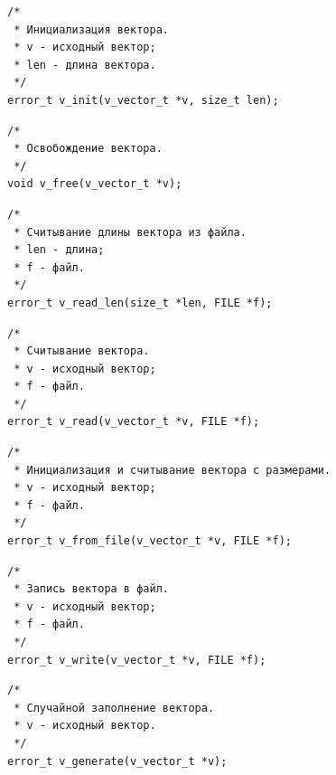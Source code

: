 \documentclass[a4paper,12pt]{extarticle}
\begin{document}
 \vspace{0.5cm}

\begin{verbatim}
/*
 * Инициализация вектора.
 * v - исходный вектор;
 * len - длина вектора.
 */
error_t v_init(v_vector_t *v, size_t len);
\end{verbatim}


 \vspace{0.5cm}

\begin{verbatim}
/*
 * Освобождение вектора.
 */
void v_free(v_vector_t *v);
\end{verbatim}


 \vspace{0.5cm}

\begin{verbatim}
/*
 * Считывание длины вектора из файла.
 * len - длина;
 * f - файл.
 */
error_t v_read_len(size_t *len, FILE *f);
\end{verbatim}


 \vspace{0.5cm}

\begin{verbatim}
/*
 * Считывание вектора.
 * v - исходный вектор;
 * f - файл.
 */
error_t v_read(v_vector_t *v, FILE *f);
\end{verbatim}


 \vspace{0.5cm}

\begin{verbatim}
/*
 * Инициализация и считывание вектора с размерами.
 * v - исходный вектор;
 * f - файл.
 */
error_t v_from_file(v_vector_t *v, FILE *f);
\end{verbatim}


 \vspace{0.5cm}

\begin{verbatim}
/*
 * Запись вектора в файл.
 * v - исходный вектор;
 * f - файл.
 */
error_t v_write(v_vector_t *v, FILE *f);
\end{verbatim}


 \vspace{0.5cm}

\begin{verbatim}
/*
 * Случайной заполнение вектора.
 * v - исходный вектор.
 */
error_t v_generate(v_vector_t *v);
\end{verbatim}


 \vspace{0.5cm}
\end{document}
